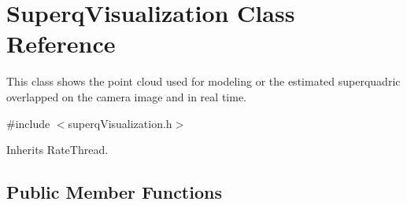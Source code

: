 \section{Superq\+Visualization Class Reference}
\label{classSuperqVisualization}


This class shows the point cloud used for modeling or the estimated superquadric overlapped on the camera image and in real time.  




{\ttfamily \#include $<$superq\+Visualization.\+h$>$}



Inherits Rate\+Thread.

\subsection*{Public Member Functions}
